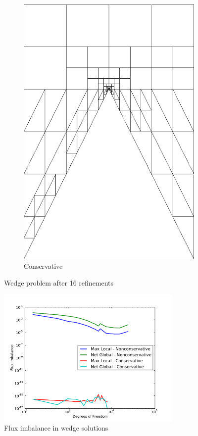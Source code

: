 \documentclass[letterpaper]{article}
\begin{document}
\begin{figure}[p]
\begin{subfigure}[t]{0.4\textwidth}
\includegraphics[width=\textwidth]{figs/Wedge/modified16c_mesh.png}
\caption{Conservative}
\label{fig:wedgeRobust16nc}
\end{subfigure}
\caption{Wedge problem after 16 refinements}
\label{fig:wedge}
\end{figure}

\begin{figure}[h!]
\centering
\includegraphics[width=0.8\textwidth]{figs/Wedge/modifiedFlux.pdf}
\caption{Flux imbalance in wedge solutions}
\label{fig:wedge_flux}
\end{figure}
\end{document}
